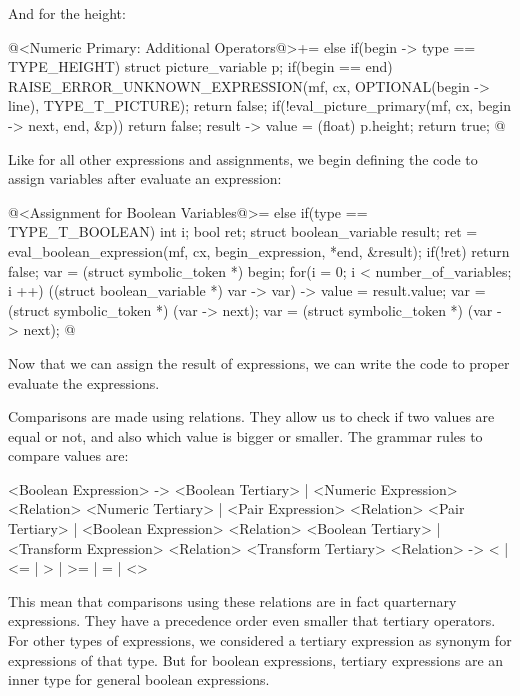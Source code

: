 {{{{{And for the height:

\iniciocodigo
@<Numeric Primary: Additional Operators@>+=
else if(begin -> type == TYPE_HEIGHT){
  struct picture_variable p;
  if(begin == end){
    RAISE_ERROR_UNKNOWN_EXPRESSION(mf, cx, OPTIONAL(begin -> line),
                                   TYPE_T_PICTURE);
    return false;
  }
  if(!eval_picture_primary(mf, cx, begin -> next, end, &p))
    return false;
  result -> value = (float) p.height;
  return true;
}
@
\fimcodigo



Like for all other expressions and assignments, we begin defining the
code to assign variables after evaluate an expression:

\iniciocodigo
@<Assignment for Boolean Variables@>=
else if(type == TYPE_T_BOOLEAN){
  int i;
  bool ret;
  struct boolean_variable result;
  ret = eval_boolean_expression(mf, cx, begin_expression, *end, &result);
  if(!ret)
    return false;
  var = (struct symbolic_token *) begin;
  for(i = 0; i < number_of_variables; i ++){
    ((struct boolean_variable *) var -> var) -> value = result.value;
    var = (struct symbolic_token *) (var -> next);
    var = (struct symbolic_token *) (var -> next);
  }
}
@
\fimcodigo

Now that we can assign the result of expressions, we can write the
code to proper evaluate the expressions.


Comparisons are made using relations. They allow us to check if two
values are equal or not, and also which value is bigger or
smaller. The grammar rules to compare values are:

\alinhaverbatim
<Boolean Expression> -> <Boolean Tertiary> |
                        <Numeric Expression> <Relation> <Numeric Tertiary> |
                        <Pair Expression> <Relation> <Pair Tertiary>       |
                        <Boolean Expression> <Relation> <Boolean Tertiary> |
                        <Transform Expression> <Relation> <Transform Tertiary>
<Relation> -> < | <= | > | >= | = | <>
\alinhanormal

This mean that comparisons using these relations are in fact
quarternary expressions. They have a precedence order even smaller
that tertiary operators. For other types of expressions, we considered
a tertiary expression as synonym for expressions of that type. But for
boolean expressions, tertiary expressions are an inner type for
general boolean expressions.

}}}}}
